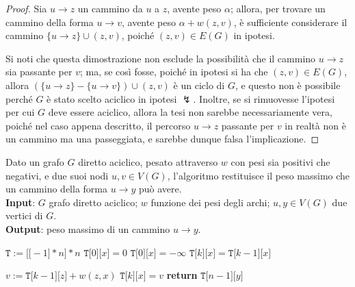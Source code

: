 \documentclass[a4paper, 12pt]{report}
\begin{document}
    \begin{proof}
        Sia $u \rightarrow z$ un cammino da $u$ a $z$, avente peso $\alpha$; allora, per trovare un cammino della forma $u \rightarrow v$, avente peso $\alpha + w(z, v)$, è sufficiente considerare il cammino $\{u \rightarrow z\} \cup (z, v)$, poiché $(z, v) \in E(G)$ in ipotesi.

        Si noti che questa dimostrazione non esclude la possibilità che il cammino $u \rightarrow z$ sia passante per $v$; ma, se così fosse, poiché in ipotesi si ha che $(z, v) \in E(G)$, allora $(\{u \rightarrow z\} - \{u \rightarrow v\}) \cup (z, v)$ è un ciclo di $G$, e questo non è possibile perché $G$ è stato scelto aciclico in ipotesi $\lightning$. Inoltre, se si rimuovesse l'ipotesi per cui $G$ deve essere aciclico, allora la tesi non sarebbe necessariamente vera, poiché nel caso appena descritto, il percorso $u \rightarrow z$ passante per $v$ in realtà non è un cammino ma una passeggiata, e sarebbe dunque falsa l'implicazione.
    \end{proof}

    \begin{algorithm}[H]
        \caption{
            Dato un grafo $G$ diretto aciclico, pesato attraverso $w$ con pesi sia positivi che negativi, e due suoi nodi $u, v \in V(G)$, l'algoritmo restituisce il peso massimo che un cammino della forma $u \rightarrow y$ può avere.\\
            \textbf{Input}: $G$ grafo diretto aciclico; $w$ funzione dei pesi degli archi; $u, y \in V(G)$ due vertici di $G$.\\
            \textbf{Output}: peso massimo di un cammino $u \rightarrow y$.
        }

        \begin{algorithmic}[1]
            \label{maxWeightPaths}
                \State $\texttt{T} := \texttt{[[}-1\texttt{]} * n \texttt{]} * n$
                        \State $\texttt{T[}0\texttt{][}x\texttt{]} = 0$
                    \Else
                        \State $\texttt{T[}0\texttt{][}x\texttt{]} = - \infty$
                    \EndIf
                \EndFor
                        \State $\texttt{T[}k\texttt{][}x\texttt{]} = \texttt{T[}k -1 \texttt{][}x\texttt{]}$ 

                         
                            \State $v := \texttt{T[}k-1\texttt{][}z\texttt{]} + w(z, x)$
                                \State $\texttt{T[}k\texttt{][}x\texttt{]} = v$
                            \EndIf
                        \EndFor
                    \EndFor
                \EndFor
                \State \textbf{return} $\texttt{T[}n- 1\texttt{][}y\texttt{]}$
            \EndFunction
        \end{algorithmic}
    \end{algorithm}
\end{document}
